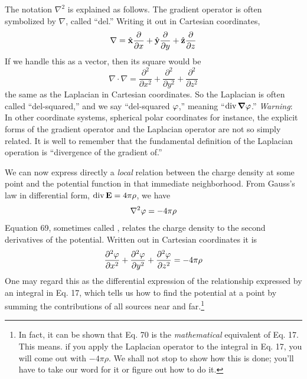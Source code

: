 The notation $\nabla^2$ is explained as follows. The gradient operator is
often symbolized by $\nabla$, called ``del.'' Writing it out in Cartesian
coordinates,
\begin{equation}
  \nabla = \hat{\mathbf{x}}\frac{\partial}{\partial x}+\hat{\mathbf{y}}\frac{\partial}{\partial y}+\hat{\mathbf{z}}\frac{\partial}{\partial z}
\end{equation}
If we handle this as a vector, then its square would be
\begin{equation}
  \nabla\cdot\nabla = \frac{\partial^2}{\partial x^2}+
                                       \frac{\partial^2}{\partial y^2}+
                                       \frac{\partial^2}{\partial z^2}
\end{equation}
the same as the Laplacian in Cartesian coordinates. So the Laplacian
is often called ``del-squared,'' and we say ``del-squared $\varphi$,''
meaning ``$\operatorname{div} \boldsymbol{\nabla} \varphi$.'' \emph{Warning}: In other coordinate systems,
spherical polar coordinates for instance, the explicit forms of the
gradient operator and the Laplacian operator are not so simply related.
It is well to remember that the fundamental definition of the
Laplacian operation is ``divergence of the gradient of.''

We can now express directly a \emph{local} relation between the charge
density at some point and the potential function in that immediate
neighborhood. From Gauss's law in differential form, $\operatorname{div}\mathbf{E}=4\pi\rho$,
we have
\begin{equation}
  \nabla^2\varphi = -4\pi\rho
\end{equation}
Equation 69, sometimes called , relates the charge
density to the second derivatives of the potential. Written out in
Cartesian coordinates it is
\begin{equation}
  \frac{\partial^2\varphi}{\partial x^2}+
                                       \frac{\partial^2\varphi}{\partial y^2}+
                                       \frac{\partial^2\varphi}{\partial z^2}
   = -4\pi\rho
\end{equation}
One may regard this as the differential expression of the relationship
expressed by an integral in Eq. 17, which tells us how to find the potential
at a point by summing the contributions of all sources near
and far.\footnote{In fact, it can be shown that Eq. 70 is the \emph{mathematical} equivalent of Eq. 17. This
means. if you apply the Laplacian operator to the integral in Eq. 17, you will come
out with $-4\pi\rho$. We shall not stop to show how this is done; you'll have to take our
word for it or figure out how to do it.}



